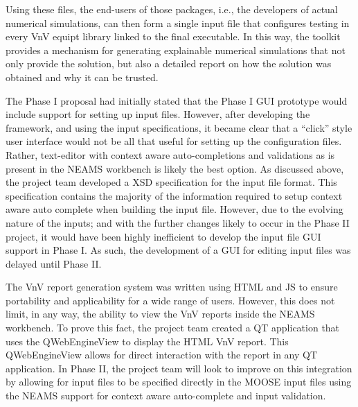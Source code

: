 Using these files, the end-users of those packages, i.e., the developers of actual numerical simulations, can then form a single input file that configures \VV testing in every VnV equipt
library linked to the final executable. In this way, the \VV toolkit provides a mechanism for generating explainable numerical simulations that not only provide the solution, but also a
detailed report on how the solution was obtained and why it can be trusted.

The Phase I proposal had initially stated that the Phase I GUI prototype would include support for setting up input files. However, after developing the framework, and using the input specifications, it became clear that a ``click'' style user interface would not be all that useful for setting up the configuration files. Rather, text-editor with context aware auto-completions and validations as is present in the NEAMS workbench is likely the best option.  As discussed above, the project team developed a XSD specification for the input file format. This specification contains the majority of the information required to setup context aware auto complete when building the input file. However, due to the evolving nature of the inputs; and with the further changes likely to occur in the Phase II project, it would have been highly inefficient to develop the input file GUI support in Phase I. As such, the development of a GUI for editing input files was delayed until Phase II. 

The VnV report generation system was written using HTML and JS to ensure portability and applicability for a wide range of users. However, this does not limit, in any way, the ability to view the VnV reports inside the NEAMS workbench. To prove this fact, the project team created a QT application that uses the QWebEngineView to display the HTML VnV report. This QWebEngineView allows for direct interaction with the report in any QT application. In Phase II, the project team will look to improve on this integration by allowing for input files to be specified directly in the MOOSE input files using the NEAMS support for context aware auto-complete and input validation. 

